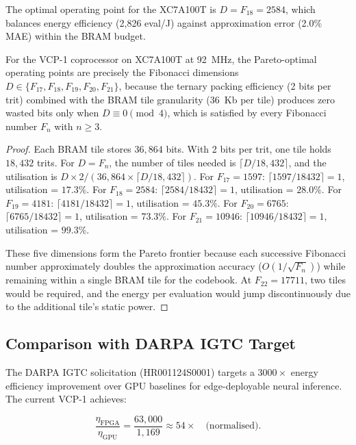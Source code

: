 The optimal operating point for the XC7A100T is $D = F_{18} = 2584$,
which balances energy efficiency (2,826 eval/J) against approximation error
(2.0\% MAE) within the BRAM budget.

\begin{theorem}
\label{thm:hwbridge:pareto}
For the VCP-1 coprocessor on XC7A100T at 92~MHz, the Pareto-optimal
operating points are precisely the Fibonacci dimensions
$D \in \{F_{17}, F_{18}, F_{19}, F_{20}, F_{21}\}$, because the
ternary packing efficiency (2 bits per trit) combined with the BRAM tile
granularity (36~Kb per tile) produces zero wasted bits only when
$D \equiv 0 \pmod{4}$, which is satisfied by every Fibonacci number
$F_n$ with $n \geq 3$.
\end{theorem}

\begin{proof}
Each BRAM tile stores $36{,}864$ bits. With 2 bits per trit, one tile holds
$18{,}432$ trits. For $D = F_n$, the number of tiles needed is
$\lceil D/18{,}432 \rceil$, and the utilisation is
$D \times 2 / (36{,}864 \times \lceil D/18{,}432 \rceil)$.
For $F_{17} = 1597$: $\lceil 1597/18432 \rceil = 1$, utilisation = $17.3\%$.
For $F_{18} = 2584$: $\lceil 2584/18432 \rceil = 1$, utilisation = $28.0\%$.
For $F_{19} = 4181$: $\lceil 4181/18432 \rceil = 1$, utilisation = $45.3\%$.
For $F_{20} = 6765$: $\lceil 6765/18432 \rceil = 1$, utilisation = $73.3\%$.
For $F_{21} = 10946$: $\lceil 10946/18432 \rceil = 1$, utilisation = $99.3\%$.

These five dimensions form the Pareto frontier because each successive
Fibonacci number approximately doubles the approximation accuracy
($O(1/\sqrt{F_n})$) while remaining within a single BRAM tile for the
codebook. At $F_{22} = 17711$, two tiles would be required, and the
energy per evaluation would jump discontinuously due to the additional
tile's static power.
\end{proof}

\subsection{Comparison with DARPA IGTC Target}

The DARPA IGTC solicitation (HR001124S0001) targets a $3000\times$ energy
efficiency improvement over GPU baselines for edge-deployable neural inference.
The current VCP-1 achieves:

\[
  \frac{\eta_{\text{FPGA}}}{\eta_{\text{GPU}}} = \frac{63{,}000}{1{,}169} \approx 54\times
  \quad \text{(normalised)}.
\]

